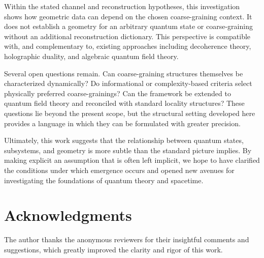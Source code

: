\documentclass[12pt,a4paper]{article}
\begin{document}
Within the stated channel and reconstruction hypotheses, this investigation shows how geometric data can depend on the chosen coarse-graining context. 
It does not establish a geometry for an arbitrary quantum state or coarse-graining without an additional reconstruction dictionary. 
This perspective is compatible with, and complementary to, existing approaches including decoherence theory, holographic duality, and algebraic quantum field theory.

Several open questions remain. 
Can coarse-graining structures themselves be characterized dynamically? 
Do informational or complexity-based criteria select physically preferred coarse-grainings? 
Can the framework be extended to quantum field theory and reconciled with standard locality structures? 
These questions lie beyond the present scope, but the structural setting developed here provides a language in which they can be formulated with greater precision.

Ultimately, this work suggests that the relationship between quantum states, subsystems, and geometry is more subtle than the standard picture implies. 
By making explicit an assumption that is often left implicit, we hope to have clarified the conditions under which emergence occurs and opened new avenues for investigating the foundations of quantum theory and spacetime.

\section*{Acknowledgments}

The author thanks the anonymous reviewers for their insightful comments and suggestions, which greatly improved the clarity and rigor of this work.
\end{document}
